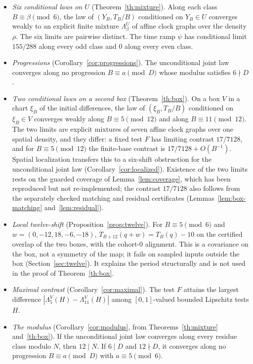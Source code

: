 \documentclass[11pt,reqno]{amsart}
\theoremstyle{remark}
\begin{document}
\begin{itemize}
\item \emph{Six conditional laws on \(U\)} (Theorem~\ref{th:mixture}). Along each class \(B\equiv\beta\pmod6\), the law of \((Y_B,T_B/B)\) conditioned on \(Y_B\in U\) converges weakly to an explicit finite mixture \(\Lambda^U_\beta\) of affine clock graphs over the density \(\rho\). The six limits are pairwise distinct. The time ramp \(\psi\) has conditional limit \(155/288\) along every odd class and \(0\) along every even class.
\item \emph{Progressions} (Corollary~\ref{cor:progressions}). The unconditional joint law converges along no progression \(B\equiv a\pmod D\) whose modulus satisfies \(6\nmid D\).
\item \emph{Two conditional laws on a second box} (Theorem~\ref{th:box}). On a box \(V\) in a chart \(\xi_B\) of the initial differences, the law of \((\xi_B,T_B/B)\) conditioned on \(\xi_B\in V\) converges weakly along \(B\equiv5\pmod{12}\) and along \(B\equiv11\pmod{12}\). The two limits are explicit mixtures of seven affine clock graphs over one spatial density, and they differ: a fixed test \(F\) has limiting contrast \(17/7128\), and for \(B\equiv5\pmod{12}\) the finite-base contrast is \(17/7128+O(B^{-1})\). Spatial localization transfers this to a six-shift obstruction for the unconditional joint law (Corollary~\ref{cor:localized}). Existence of the two limits rests on the guarded coverage of Lemma~\ref{lem:coverage}, which has been reproduced but not re-implemented; the contrast \(17/7128\) also follows from the separately checked matching and residual certificates (Lemmas~\ref{lem:box-matching} and~\ref{lem:residual}).
\item \emph{Local twelve-shift} (Proposition~\ref{prop:twelve}). For \(B\equiv5\pmod6\) and \(w=(0,-12,18,-6,-18)\), \(T_{B+12}(q+w)=T_B(q)-10\) on the certified overlap of the two boxes, with the cohort-\(0\) alignment. This is a covariance on the box, not a symmetry of the map; it fails on sampled inputs outside the box (Section~\ref{sec:twelve}). It explains the period structurally and is not used in the proof of Theorem~\ref{th:box}.
\item \emph{Maximal contrast} (Corollary~\ref{cor:maximal}). The test \(F\) attains the largest difference \(|\Lambda^V_5(H)-\Lambda^V_{11}(H)|\) among \([0,1]\)-valued bounded Lipschitz tests \(H\).
\item \emph{The modulus} (Corollary~\ref{cor:modulus}, from Theorems~\ref{th:mixture} and~\ref{th:box}). If the unconditional joint law converges along every residue class modulo \(N\), then \(12\mid N\). If \(6\mid D\) and \(12\nmid D\), it converges along no progression \(B\equiv a\pmod D\) with \(a\equiv5\pmod 6\).
\end{itemize}
\end{document}
